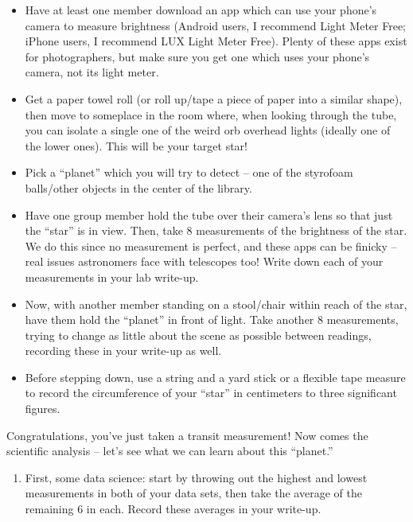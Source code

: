 \documentclass[11pt]{article}
\begin{document}
\begin{itemize}
    \item Have at least one member download an app which can use your phone’s camera to measure brightness (Android users, I recommend Light Meter Free; iPhone users, I recommend LUX Light Meter Free). Plenty of these apps exist for photographers, but make sure you get one which uses your phone’s camera, not its light meter.
    
    \item Get a paper towel roll (or roll up/tape a piece of paper into a similar shape), then move to someplace in the room where, when looking through the tube, you can isolate a single one of the weird orb overhead lights (ideally one of the lower ones). This will be your target star!
    
    \item Pick a ``planet” which you will try to detect -- one of the styrofoam balls/other objects in the center of the library.
    
    \item Have one group member hold the tube over their camera’s lens so that just the “star” is in view. Then, take 8 measurements of the brightness of the star. We do this since no measurement is perfect, and these apps can be finicky -- real issues astronomers face with telescopes too! Write down each of your measurements in your lab write-up.
    
    \item Now, with another member standing on a stool/chair within reach of the star, have them hold the ``planet” in front of light. Take another 8 measurements, trying to change as little about the scene as possible between readings, recording these in your write-up as well.
    
    \item Before stepping down, use a string and a yard stick or a flexible tape measure to record the circumference of your ``star” in centimeters to three significant figures.
\end{itemize}

\noindent
Congratulations, you’ve just taken a transit measurement! Now comes the scientific analysis -- let’s see what we can learn about this ``planet.”

\medskip \noindent
\begin{enumerate}[resume]
    \item First, some data science: start by throwing out the highest and lowest measurements in both of your data sets, then take the average of the remaining 6 in each. Record these averages in your write-up. 
\end{enumerate}
\end{document}
